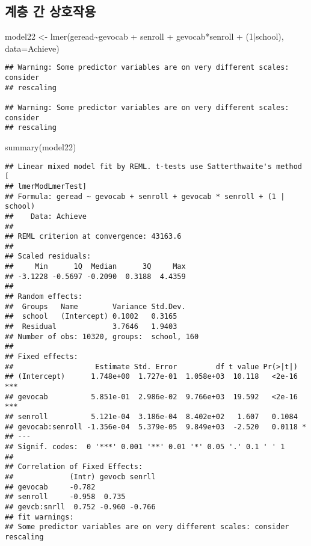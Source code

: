 \documentclass[
]{book}
\newenvironment{Shaded}{\begin{snugshade}}{\end{snugshade}}
\newcommand{\AttributeTok}[1]{\textcolor[rgb]{0.77,0.63,0.00}{#1}}
\newcommand{\DecValTok}[1]{\textcolor[rgb]{0.00,0.00,0.81}{#1}}
\newcommand{\FunctionTok}[1]{\textcolor[rgb]{0.00,0.00,0.00}{#1}}
\newcommand{\NormalTok}[1]{#1}
\newcommand{\OtherTok}[1]{\textcolor[rgb]{0.56,0.35,0.01}{#1}}
\newcommand{\SpecialCharTok}[1]{\textcolor[rgb]{0.00,0.00,0.00}{#1}}
\begin{document}
\hypertarget{uxacc4uxce35-uxac04-uxc0c1uxd638uxc791uxc6a9}{%
\subsection{계층 간 상호작용}\label{uxacc4uxce35-uxac04-uxc0c1uxd638uxc791uxc6a9}}

\begin{Shaded}
\begin{Highlighting}[]
\NormalTok{model22 }\OtherTok{\textless{}{-}} \FunctionTok{lmer}\NormalTok{(geread}\SpecialCharTok{\textasciitilde{}}\NormalTok{gevocab }\SpecialCharTok{+}\NormalTok{ senroll }\SpecialCharTok{+}\NormalTok{ gevocab}\SpecialCharTok{*}\NormalTok{senroll }\SpecialCharTok{+}\NormalTok{ (}\DecValTok{1}\SpecialCharTok{|}\NormalTok{school), }\AttributeTok{data=}\NormalTok{Achieve)}
\end{Highlighting}
\end{Shaded}

\begin{verbatim}
## Warning: Some predictor variables are on very different scales: consider
## rescaling

## Warning: Some predictor variables are on very different scales: consider
## rescaling
\end{verbatim}

\begin{Shaded}
\begin{Highlighting}[]
\FunctionTok{summary}\NormalTok{(model22)}
\end{Highlighting}
\end{Shaded}

\begin{verbatim}
## Linear mixed model fit by REML. t-tests use Satterthwaite's method [
## lmerModLmerTest]
## Formula: geread ~ gevocab + senroll + gevocab * senroll + (1 | school)
##    Data: Achieve
## 
## REML criterion at convergence: 43163.6
## 
## Scaled residuals: 
##     Min      1Q  Median      3Q     Max 
## -3.1228 -0.5697 -0.2090  0.3188  4.4359 
## 
## Random effects:
##  Groups   Name        Variance Std.Dev.
##  school   (Intercept) 0.1002   0.3165  
##  Residual             3.7646   1.9403  
## Number of obs: 10320, groups:  school, 160
## 
## Fixed effects:
##                   Estimate Std. Error         df t value Pr(>|t|)    
## (Intercept)      1.748e+00  1.727e-01  1.058e+03  10.118   <2e-16 ***
## gevocab          5.851e-01  2.986e-02  9.766e+03  19.592   <2e-16 ***
## senroll          5.121e-04  3.186e-04  8.402e+02   1.607   0.1084    
## gevocab:senroll -1.356e-04  5.379e-05  9.849e+03  -2.520   0.0118 *  
## ---
## Signif. codes:  0 '***' 0.001 '**' 0.01 '*' 0.05 '.' 0.1 ' ' 1
## 
## Correlation of Fixed Effects:
##             (Intr) gevocb senrll
## gevocab     -0.782              
## senroll     -0.958  0.735       
## gevcb:snrll  0.752 -0.960 -0.766
## fit warnings:
## Some predictor variables are on very different scales: consider rescaling
\end{verbatim}
\end{document}
